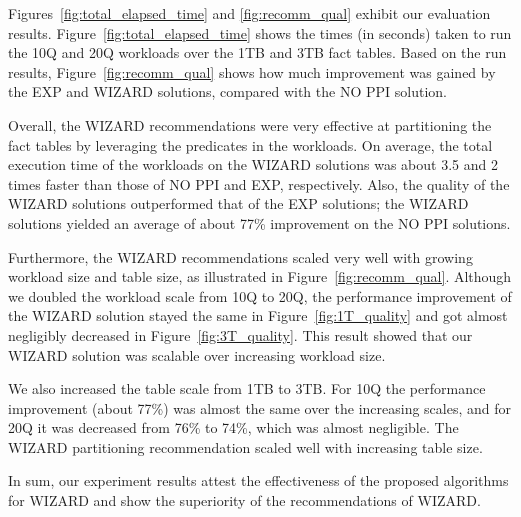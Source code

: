 \documentclass[paper]{ieice}
\begin{document}

Figures~\ref{fig:total_elapsed_time} and \ref{fig:recomm_qual} exhibit our evaluation results.
Figure~\ref{fig:total_elapsed_time} shows the times (in seconds) taken 
to run the 10Q and 20Q workloads over the 1TB and 3TB fact tables. 
Based on the run results, Figure~\ref{fig:recomm_qual} shows 
how much improvement was gained by the EXP and WIZARD solutions, compared with the NO PPI solution. 

Overall, the WIZARD recommendations were very effective at partitioning 
the fact tables by leveraging the predicates in the workloads. 
On average, the \hbox{total} execution time of the workloads on the WIZARD solutions was 
about 3.5 and 2 times faster than those of NO PPI and EXP, respectively. 
Also, the quality of the \hbox{WIZARD} solutions outperformed that of the EXP solutions; 
the WIZARD solutions yielded an average of about 77\% improvement on the NO PPI solutions.  

Furthermore, the WIZARD recommendations 
scaled very well with growing workload size and table size, 
as illustrated in Figure~\ref{fig:recomm_qual}. 
Although we doubled the workload scale from 10Q to 20Q, 
the performance improvement of the WIZARD solution stayed the same in Figure~\ref{fig:1T_quality} 
and got almost negligibly decreased in Figure~\ref{fig:3T_quality}. 
This result showed that our WIZARD \hbox{solution} was scalable over increasing workload size.

We also increased the table scale from 1TB to 3TB. 
For 10Q the performance improvement (about 77\%) was almost the same over the increasing scales, 
and for 20Q it was decreased from 76\% to 74\%, which was \hbox{almost} negligible.
The WIZARD partitioning \hbox{recommendation} scaled well with increasing table size.

In sum, our experiment results attest the effectiveness of the proposed algorithms for WIZARD 
and show the superiority of the recommendations of WIZARD.

\end{document}
